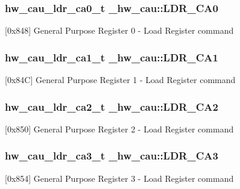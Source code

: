 \subsubsection[{\texorpdfstring{L\+D\+R\+\_\+\+C\+A0}{LDR_CA0}}]{ {\bf hw\+\_\+cau\+\_\+ldr\+\_\+ca0\+\_\+t} \+\_\+hw\+\_\+cau\+::\+L\+D\+R\+\_\+\+C\+A0}\hypertarget{struct__hw__cau_ad53e6210e118eba2a47fc7ef42335ab6}{}\label{struct__hw__cau_ad53e6210e118eba2a47fc7ef42335ab6}
\mbox{[}0x848\mbox{]} General Purpose Register 0 -\/ Load Register command 
\subsubsection[{\texorpdfstring{L\+D\+R\+\_\+\+C\+A1}{LDR_CA1}}]{ {\bf hw\+\_\+cau\+\_\+ldr\+\_\+ca1\+\_\+t} \+\_\+hw\+\_\+cau\+::\+L\+D\+R\+\_\+\+C\+A1}\hypertarget{struct__hw__cau_a00ef9f2e5fb680c01b4c5def5c91be12}{}\label{struct__hw__cau_a00ef9f2e5fb680c01b4c5def5c91be12}
\mbox{[}0x84C\mbox{]} General Purpose Register 1 -\/ Load Register command 
\subsubsection[{\texorpdfstring{L\+D\+R\+\_\+\+C\+A2}{LDR_CA2}}]{ {\bf hw\+\_\+cau\+\_\+ldr\+\_\+ca2\+\_\+t} \+\_\+hw\+\_\+cau\+::\+L\+D\+R\+\_\+\+C\+A2}\hypertarget{struct__hw__cau_aad4eba0f6636f65ceead99929eff01b3}{}\label{struct__hw__cau_aad4eba0f6636f65ceead99929eff01b3}
\mbox{[}0x850\mbox{]} General Purpose Register 2 -\/ Load Register command 
\subsubsection[{\texorpdfstring{L\+D\+R\+\_\+\+C\+A3}{LDR_CA3}}]{ {\bf hw\+\_\+cau\+\_\+ldr\+\_\+ca3\+\_\+t} \+\_\+hw\+\_\+cau\+::\+L\+D\+R\+\_\+\+C\+A3}\hypertarget{struct__hw__cau_a01ae9b748215cdece59e2b4932aeb83b}{}\label{struct__hw__cau_a01ae9b748215cdece59e2b4932aeb83b}
\mbox{[}0x854\mbox{]} General Purpose Register 3 -\/ Load Register command 
